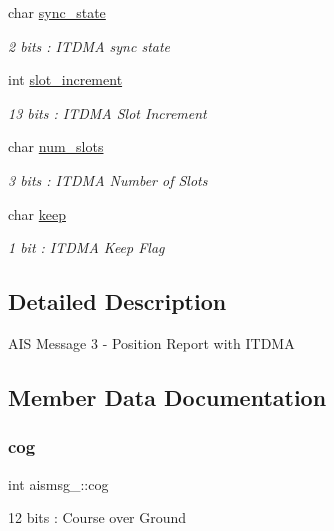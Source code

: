 \begin{DoxyCompactItemize}
char \mbox{\hyperlink{structaismsg__3_a01c010a9d009cd92c793430877e8d94d}{sync\+\_\+state}}
\begin{DoxyCompactList}\small\item\em 2 bits \+: I\+T\+D\+MA sync state \end{DoxyCompactList}\item 
int \mbox{\hyperlink{structaismsg__3_ab12da2139a0b02e66a78cf910c5e1f6c}{slot\+\_\+increment}}
\begin{DoxyCompactList}\small\item\em 13 bits \+: I\+T\+D\+MA Slot Increment \end{DoxyCompactList}\item 
char \mbox{\hyperlink{structaismsg__3_a76d66b19a4f6acf258ab32febf01d20e}{num\+\_\+slots}}
\begin{DoxyCompactList}\small\item\em 3 bits \+: I\+T\+D\+MA Number of Slots \end{DoxyCompactList}\item 
char \mbox{\hyperlink{structaismsg__3_ae25e531216ad572cd2fa82eee759e0fb}{keep}}
\begin{DoxyCompactList}\small\item\em 1 bit \+: I\+T\+D\+MA Keep Flag \end{DoxyCompactList}\end{DoxyCompactItemize}


\subsection{Detailed Description}
A\+IS Message 3 -\/ Position Report with I\+T\+D\+MA 

\subsection{Member Data Documentation}
\mbox{\label{structaismsg__3_a835fa458851b1c28ba11bea80032c962}} 
\subsubsection{\texorpdfstring{cog}{cog}}
{\footnotesize\ttfamily int aismsg\+\_\+::cog}



12 bits \+: Course over Ground 

\mbox{\label{structaismsg__3_ae25e531216ad572cd2fa82eee759e0fb}} 

